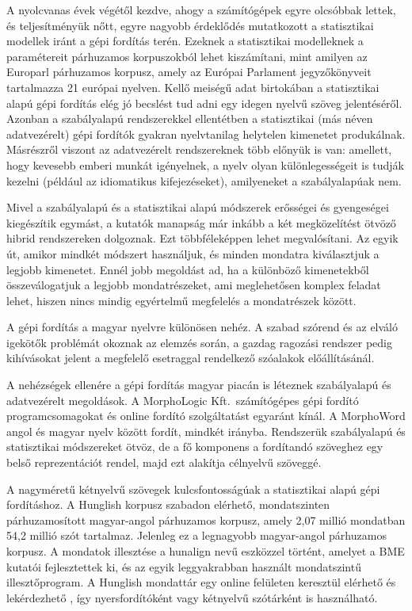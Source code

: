 \begin{multicols}{2}
A nyolcvanas évek végétől kezdve, ahogy a számítógépek egyre olcsóbbak lettek, és teljesítményük nőtt, egyre nagyobb érdeklődés mutatkozott a statisztikai modellek iránt a gépi fordítás terén. Ezeknek a statisztikai modelleknek a paramétereit párhuzamos korpuszokból lehet kiszámítani, mint amilyen az Europarl pár\-hu\-za\-mos korpusz, amely az Európai Parlament jegyzőkönyveit tartalmazza 21 európai nyelven. Kellő meiségű adat birtokában a statisztikai alapú gépi fordítás elég jó becslést tud adni egy idegen nyelvű szöveg jelentéséről. Azonban a szabályalapú rendszerekkel ellentétben a statisztikai (más néven adatvezérelt) gépi fordítók gyakran nyelvtanilag helytelen kimenetet produkálnak. Másrészről vi\-szont az adatvezérelt rendszereknek több előnyük is van: amellett, hogy kevesebb emberi munkát igényelnek, a nyelv olyan különlegességeit is tudják kezelni (például az idiomatikus kifejezéseket), amilyeneket a szabályalapúak nem. 

Mivel a szabályalapú és a statisztikai alapú módszerek erősségei és gyengeségei kiegészítik egymást, a kutatók manapság már inkább a két megközelítést ötvöző hib\-rid rendszereken dolgoznak. Ezt több\-fé\-le\-kép\-pen lehet megvalósítani. Az egyik út, amikor mindkét módszert használjuk, és minden mondatra kiválasztjuk a legjobb kimenetet. Ennél jobb megoldást ad, ha a különböző kimenetekből összeválogatjuk a legjobb mondatrészeket, ami meglehetősen komplex feladat lehet, hiszen nincs mindig egyértelmű megfelelés a mondatrészek között.  


A gépi fordítás a magyar nyelvre különösen nehéz. A szabad szórend és az elváló igekötők problémát okoznak az elemzés során, a gazdag ragozási rendszer pedig kihívásokat jelent a megfelelő esetraggal rendelkező szóalakok előállításánál.

A nehézségek ellenére a gépi fordítás ma\-gyar piacán is léteznek szabályalapú és adatvezérelt megoldások. A MorphoLogic Kft.\ számítógépes gépi fordító prog\-ram\-cso\-ma\-go\-kat és online fordító szolgáltatást egyaránt kínál. A MorphoWord angol és magyar nyelv között fordít, mindkét irányba. Rendszerük szabályalapú és statisztikai módszereket ötvöz, de a fő komponens a fordítandó szöveghez egy belső reprezentációt rendel, majd ezt alakítja célnyelvű szöveggé. 

A nagyméretű kétnyelvű szövegek kulcsfontosságúak a statisztikai alapú gépi fordításhoz. A Hunglish korpusz szabadon elérhető, mondatszinten párhuzamosított magyar-angol párhuzamos korpusz, amely 2,07 millió mondatban 54,2 millió szót tartalmaz. Jelenleg ez a legnagyobb magyar-angol párhuzamos korpusz. A mondatok illesztése a hunalign nevű esz\-köz\-zel történt, amelyet a BME kutatói fej\-lesz\-tet\-tek ki, és az egyik leggyakrabban használt mondatszintű il\-lesz\-tő\-prog\-ram. A Hunglish mondattár egy online felületen keresztül elérhető és lekérdezhető \cite{hunglish}, így nyersfordítóként vagy kétnyelvű szótárként is használható.


\end{multicols}
